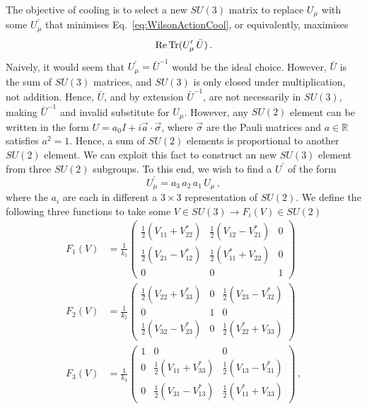 The objective of cooling is to select a new $SU(3)$ matrix to replace $U_\mu$ with some $U_\mu^\prime$ that minimises Eq.~\ref{eq:WilsonActionCool}, or equivalently, maximises
\begin{equation}
\operatorname{Re} \operatorname{Tr} (U_\mu^\prime \, \bar{U})\, .
\end{equation}
Naively, it would seem that $U_\mu^\prime = \bar{U}^{-1}$ would be the ideal choice. However, $\bar{U}$ is the sum of $SU(3)$ matrices, and $SU(3)$ is only closed under multiplication, not addition. Hence, $\bar{U}$, and by extension $\bar{U}^{-1}$, are not necessarily in $SU(3)$, making $\bar{U}^{-1}$ and invalid substitute for $U_\mu$. However, any $SU(2)$ element can be written in the form $U = a _ { 0 } I + i \vec { a } \cdot \vec { \sigma }$, where $\vec{\sigma}$ are the Pauli matrices and $a\in\mathbb{R}$  satisfies $a^2=1$. Hence, a sum of $SU(2)$ elements is proportional to another $SU(2)$ element. We can exploit this fact to construct an new $SU(3)$ element from three $SU(2)$ subgroups. To this end, we wish to find a $U^\prime$ of the form
%
\begin{equation}
U^\prime_\mu = a_3\,a_2\,a_1\,U_\mu\, ,
\label{eq:UPrime}
\end{equation}
%
where the $a_i$ are each in different a $3\times 3$ representation of $SU(2)$. We define the following three functions to take some $V\in SU(3)\rightarrow F_i(V)\in SU(2)$
%
\begin{align*}
F_1(V) &=\frac{1}{k_1} \begin{pmatrix}
\frac{1}{2}\left(V_{11} + V_{22}^*\right) & \frac{1}{2}\left(V_{12} - V_{21}^*\right) & 0\\
\frac{1}{2}\left(V_{21} - V_{12}^*\right) & \frac{1}{2}\left(V_{11}^* + V_{22}\right) & 0\\
0 & 0 & 1
\end{pmatrix}\\
F_2(V) &=\frac{1}{k_2} \begin{pmatrix}
\frac{1}{2}\left(V_{22} + V_{33}^*\right) & 0 &\frac{1}{2}\left(V_{23} - V_{32}^*\right)\\
0 & 1 & 0\\
\frac{1}{2}\left(V_{32} - V_{23}^*\right) & 0 & \frac{1}{2}\left(V_{22}^* + V_{33}\right)
\end{pmatrix}\\[10pt]
F_3(V) &=\frac{1}{k_3} \begin{pmatrix}
1 & 0 & 0\\
0 & \frac{1}{2}\left(V_{11} + V_{33}^*\right) & \frac{1}{2}\left(V_{13} - V_{31}^*\right)\\
0 & \frac{1}{2}\left(V_{31} - V_{13}^*\right) & \frac{1}{2}\left(V_{11}^* + V_{33}\right)
\end{pmatrix}\, ,
\end{align*}
